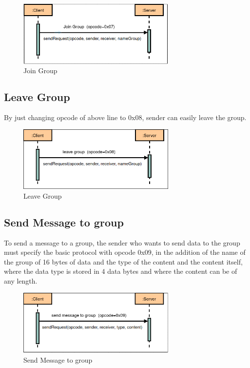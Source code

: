 \begin{figure}[htb!]
    \centering
    \includegraphics[width=0.7\textwidth]{gfx/protocoll_join_group}
    \caption{Join Group}
    \label{fig:join-group}
\end{figure}

\subsection{Leave Group}\label{subsec:leave}
By just changing opcode of above line to 0x08, sender can easily leave the group.

\begin{figure}[htb!]
    \centering
    \includegraphics[width=0.7\textwidth]{gfx/protocoll_leave_group}
    \caption{Leave Group}
    \label{fig:leave-group}
\end{figure}

\subsection{Send Message to group}\label{subsec:send-message-to-group}
To send a message to a group, the sender who wants to send data to the group must specify the basic
protocol with opcode 0x09, in the addition of the name of the group of 16 bytes of data and the
type of the content and the content itself, where the data type is stored in 4 data bytes and where
the content can be of any length.

\begin{figure}[htb!]
    \centering
    \includegraphics[width=0.7\textwidth]{gfx/protocoll_message_group}
    \caption{Send Message to group}
    \label{fig:send-message-to-group}
\end{figure}



